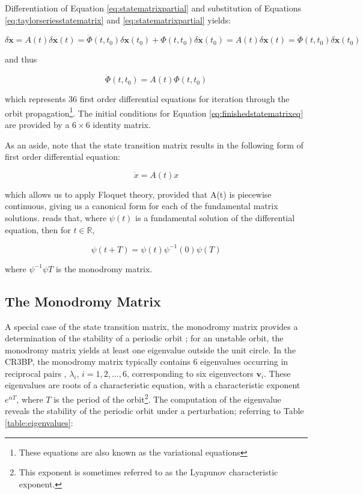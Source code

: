 \noindent Differentiation of Equation \ref{eq:statematrixpartial} and substitution of Equations \ref{eq:taylorseriesstatematrix} and \ref{eq:statematrixpartial} yields:

\begin{equation}
\delta \pmb{\dot{x}} = A \left( t \right) \delta \pmb{x} \left( t \right) = \dot{\Phi}\left(t, t_0\right) \delta \pmb{x} \left( t_0 \right) + \Phi \left(t, t_0\right) \delta\pmb{\dot{x}}\left(t_0\right) = A \left( t \right) \delta \pmb{x} \left( t \right) = \dot{\Phi}\left(t, t_0\right) \delta \pmb{x} \left( t_0 \right)
\end{equation}

\noindent and thus

\begin{equation}\label{eq:finishedstatematrixeq}
\dot{\Phi} \left( t, t_0 \right) = A\left( t\right)\Phi(t, t_0)
\end{equation}

\noindent which represents 36 first order differential equations for iteration through the orbit propagation\footnote{These equations are also known as the variational equations}. The initial conditions for Equation \ref{eq:finishedstatematrixeq} are provided by a $6\times 6$ identity matrix.

As an aside, note that the state transition matrix results in the following form of first order differential equation:

\begin{equation}
\dot{x} = A(t) x
\end{equation}

which allows us to apply Floquet theory, provided that A(t) is piecewise continuous, giving us a canonical form for each of the fundamental matrix solutions. \citep{Floquet1883} reads that, where $\psi (t)$ is a fundamental solution of the differential equation, then for $t \in \mathbb{R}$,

\begin{equation}
\psi(t+T) = \psi(t)\psi^{-1}(0)\psi(T)
\end{equation}

where $\psi^{-1}\psi{T}$ is the monodromy matrix.

\subsection{The Monodromy Matrix}

A special case of the state transition matrix, the monodromy matrix provides a determination of the stability of a periodic orbit \citep{Russell2006}; for an unstable orbit, the monodromy matrix yields at least one eigenvalue outside the unit circle. In the CR3BP, the monodromy matrix typically contains 6 eigenvalues occurring in reciprocal pairs \citep{broucke1968}, $\lambda_i$, $i = 1, 2, ..., 6$, corresponding to six eigenvectors $\pmb{v}_i$. These eigenvalues are roots of a characteristic equation, with a characteristic exponent $e^{\alpha T}$, where $T$ is the period of the orbit\footnote{This exponent is sometimes referred to as the Lyapunov characteristic exponent.}. The computation of the eigenvalue reveals the stability of the periodic orbit under a perturbation; referring to Table \ref{table:eigenvalues}:

